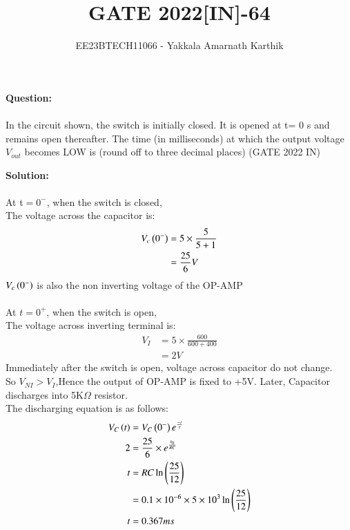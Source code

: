 \documentclass[journal,12pt,twocolumn]{IEEEtran}
\begin{document}


\title{GATE 2022[IN]-64}
\author{EE23BTECH11066 - Yakkala Amarnath Karthik}
\maketitle


\textbf{Question:}\\ \\
In the circuit shown, the switch is initially closed. It is opened at t= 0 s and
remains open thereafter. The time (in milliseconds) at which the output voltage
$V_{out}$ becomes LOW is  (round off to three decimal places) \hfill(GATE 2022 IN)\


\textbf{Solution:}\\ \\
At t$=0^-$, when the switch is closed,\\
The voltage across the capacitor is:
\begin{align}
V_c\left(0^-\right)&=5\times\frac{5}{5+1}\\
&=\frac{25}{6}V
\end{align}
$V_c\left(0^-\right)$ is also the non inverting voltage of the OP-AMP\\ \\
At $t=0^+$, when the switch is open,\\
The voltage across inverting terminal is:
\begin{align}
V_I&=5\times\frac{600}{600+400}\\
&=2V
\end{align}
Immediately after the switch is open, voltage across capacitor do not change.\\ So $V_{NI}>V_I$,Hence the output of OP-AMP is fixed to +5V.
Later, Capacitor discharges into 5K$\Omega$ resistor.\\
The discharging equation is as follows:
\begin{align}
    V_C\left(t\right)&=V_C\left(0^-\right)e^{\frac{-t}{\tau}}\\ 
    2&=\frac{25}{6}\times e^{\frac{t_0}{RC}}\\
    t&=RC\ln\left(\frac{25}{12}\right)\\
    &=0.1\times10^{-6}\times5\times10^{3}\ln{\ensuremath{\left(\frac{25}{12}\right)}}\\
    t&=0.367ms
\end{align}


\end{document}
